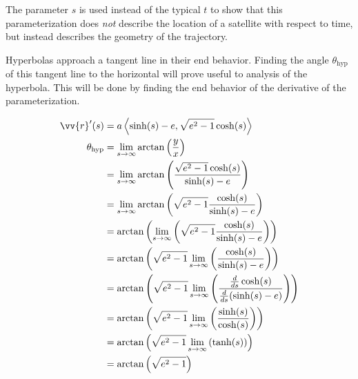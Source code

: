 \documentclass{article}
\begin{document}
The parameter $s$ is used instead of the typical $t$ to show that this parameterization does \textit{not} describe the location of a satellite with respect to time, but instead describes the geometry of the trajectory.

Hyperbolas approach a tangent line in their end behavior. Finding the angle $\theta_\text{hyp}$ of this tangent line to the horizontal will prove useful to analysis of the hyperbola. This will be done by finding the end behavior of the derivative of the parameterization.

\begin{align*}
    \vv{r}'(s)        & =a\left\langle\sinh(s)-e, \sqrt{e^2-1}\cosh(s)\right\rangle                                                                  \\
    \theta_\text{hyp} & =\lim_{s\rightarrow\infty}\arctan\left(\frac{y}{x}\right)                                                                    \\
                      & =\lim_{s\rightarrow\infty}\arctan\left(\frac{\sqrt{e^2-1}\cosh(s)}{\sinh(s)-e}\right)                                        \\
                      & =\lim_{s\rightarrow\infty}\arctan\left(\sqrt{e^2-1}\frac{\cosh(s)}{\sinh(s)-e}\right)                                        \\
                      & =\arctan\left(\lim_{s\rightarrow\infty}\left(\sqrt{e^2-1}\frac{\cosh(s)}{\sinh(s)-e}\right)\right)                           \\
                      & =\arctan\left(\sqrt{e^2-1}\lim_{s\rightarrow\infty}\left(\frac{\cosh(s)}{\sinh(s)-e}\right)\right)                           \\
                      & =\arctan\left(\sqrt{e^2-1}\lim_{s\rightarrow\infty}\left(\frac{\frac{d}{ds}\cosh(s)}{\frac{d}{ds}(\sinh(s)-e)}\right)\right) \\
                      & =\arctan\left(\sqrt{e^2-1}\lim_{s\rightarrow\infty}\left(\frac{\sinh(s)}{\cosh(s)}\right)\right)                             \\
                      & =\arctan\left(\sqrt{e^2-1}\lim_{s\rightarrow\infty}\left(\tanh(s)\right)\right)                                              \\
                      & =\arctan\left(\sqrt{e^2-1}\right)                                                                                            \\
\end{align*}
\end{document}
